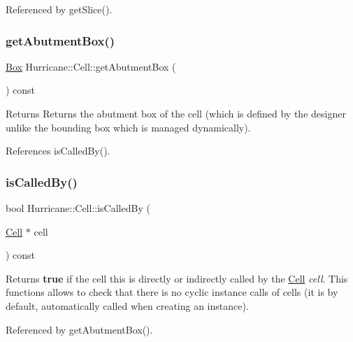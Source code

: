 Referenced by get\+Slice().

\mbox{\label{classHurricane_1_1Cell_a142360ca7b3c1c637894f5b9a2cac069}} 
\subsubsection{\texorpdfstring{get\+Abutment\+Box()}{getAbutmentBox()}}
{\footnotesize\ttfamily \hyperlink{classHurricane_1_1Box}{Box} Hurricane\+::\+Cell\+::get\+Abutment\+Box (\begin{DoxyParamCaption}{ }\end{DoxyParamCaption}) const\hspace{0.3cm}{\ttfamily [inline]}}

Returns Returns the abutment box of the cell (which is defined by the designer unlike the bounding box which is managed dynamically). 

References is\+Called\+By().

\mbox{\label{classHurricane_1_1Cell_a239354e1b4ad9b751abf5a064e43b0e6}} 
\subsubsection{\texorpdfstring{is\+Called\+By()}{isCalledBy()}}
{\footnotesize\ttfamily bool Hurricane\+::\+Cell\+::is\+Called\+By (\begin{DoxyParamCaption}\item[{\hyperlink{classHurricane_1_1Cell}{Cell} $\ast$}]{cell }\end{DoxyParamCaption}) const}

Returns {\bfseries true} if the cell {\ttfamily this} is directly or indirectly called by the \hyperlink{classHurricane_1_1Cell}{Cell} {\itshape cell}. This functions allows to check that there is no cyclic instance calls of cells (it is by default, automatically called when creating an instance). 

Referenced by get\+Abutment\+Box().

\mbox{\label{classHurricane_1_1Cell_aac4e9218b7806f3a0f2d5a55f00abd69}} 
